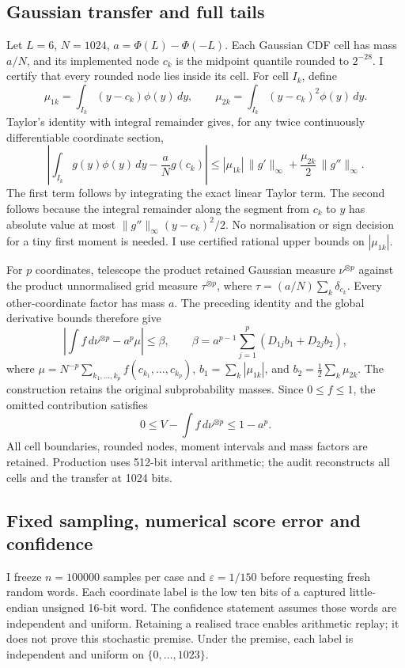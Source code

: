 \subsection{Gaussian transfer and full tails}

Let \(L=6\), \(N=1024\), \(a=\Phi(L)-\Phi(-L)\).  Each Gaussian CDF cell
has mass \(a/N\), and its implemented node \(c_k\) is the midpoint
quantile rounded to \(2^{-28}\).  I certify that every rounded node lies
inside its cell.  For cell \(I_k\), define
\[
 \mu_{1k}=\int_{I_k}(y-c_k)\phi(y)\,dy,\qquad
 \mu_{2k}=\int_{I_k}(y-c_k)^2\phi(y)\,dy.
\]
Taylor's identity with integral remainder gives, for any twice continuously
differentiable coordinate section,
\[
 \left|\int_{I_k}g(y)\phi(y)\,dy-\frac aN g(c_k)\right|
 \leq |\mu_{1k}|\,\|g'\|_\infty+
                       \frac{\mu_{2k}}2\,\|g''\|_\infty.
\]
The first term follows by integrating the exact linear Taylor term.  The
second follows because the integral remainder along the segment from
\(c_k\) to \(y\) has absolute value at most
\(\|g''\|_\infty(y-c_k)^2/2\).  No normalisation or sign decision for a
tiny first moment is needed.  I use certified rational upper bounds on
\(|\mu_{1k}|\).

For \(p\) coordinates, telescope the product retained Gaussian measure
\(\nu^{\otimes p}\) against the product unnormalised grid measure
\(\tau^{\otimes p}\), where \(\tau=(a/N)\sum_k\delta_{c_k}\).
Every other-coordinate factor has mass \(a\).  The preceding identity and
the global derivative bounds therefore give
\[
 \left|\int f\,d\nu^{\otimes p}-a^p\mu\right|\leq\beta,
 \qquad
 \beta=a^{p-1}\sum_{j=1}^p\left(D_{1j}b_1+D_{2j}b_2\right),
\]
where \(\mu=N^{-p}\sum_{k_1,\ldots,k_p}f(c_{k_1},\ldots,c_{k_p})\),
\(b_1=\sum_k|\mu_{1k}|\), and \(b_2=\frac12\sum_k\mu_{2k}\).
The construction retains the original subprobability masses.
Since \(0\leq f\leq1\), the omitted contribution satisfies
\[
 0\leq V-\int f\,d\nu^{\otimes p}\leq1-a^p.
\]
All cell boundaries, rounded nodes, moment intervals and mass factors are
retained.  Production uses 512-bit interval arithmetic; the audit
reconstructs all cells and the transfer at 1024 bits.

\subsection{Fixed sampling, numerical score error and confidence}

I freeze \(n=100000\) samples per case and \(\varepsilon=1/150\) before
requesting fresh random words.  Each coordinate label is the low ten bits
of a captured little-endian unsigned 16-bit word.  The confidence statement
assumes those words are independent and uniform.  Retaining a realised
trace enables arithmetic replay; it does not prove this stochastic premise.
Under the premise, each label is independent and uniform on
\(\{0,\ldots,1023\}\).

